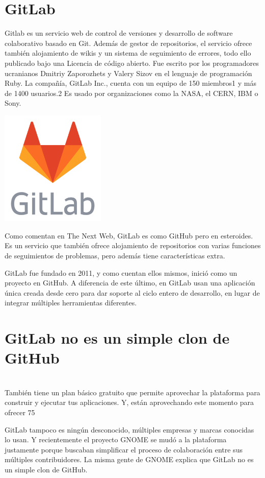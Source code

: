 
\section{GitLab} 
Gitlab es un servicio web de control de versiones y desarrollo de software colaborativo basado en Git. Además de gestor de repositorios, el servicio ofrece también alojamiento de wikis y un sistema de seguimiento de errores, todo ello publicado bajo una Licencia de código abierto.
Fue escrito por los programadores ucranianos Dmitriy Zaporozhets y Valery Sizov en el lenguaje de programación Ruby. La compañía, GitLab Inc., cuenta con un equipo de 150 miembros1​ y más de 1400 usuarios.2​ Es usado por organizaciones como la NASA, el CERN, IBM o Sony.
\begin{itemize}
	\begin{center}
	\includegraphics[width=5cm]{./Imagenes/imagen6} 
	\end{center}
\end{itemize} 
Como comentan en The Next Web, GitLab es como GitHub pero en esteroides. Es un servicio que también ofrece alojamiento de repositorios con varias funciones de seguimientos de problemas, pero además tiene características extra.

GitLab fue fundado en 2011, y como cuentan ellos mismos, inició como un proyecto en GitHub. A diferencia de este último, en GitLab usan una aplicación única creada desde cero para dar soporte al ciclo entero de desarrollo, en lugar de integrar múltiples herramientas diferentes.\\



\section{GitLab no es un simple clon de GitHub} \\

También tiene un plan básico gratuito que permite aprovechar la plataforma para construir y ejecutar tus aplicaciones. Y, están aprovechando este momento para ofrecer 75%

GitLab tampoco es ningún desconocido, múltiples empresas y marcas conocidas lo usan. Y recientemente el proyecto GNOME se mudó a la plataforma justamente porque buscaban simplificar el proceso de colaboración entre sus múltiples contribuidores. La misma gente de GNOME explica que GitLab no es un simple clon de GitHub.